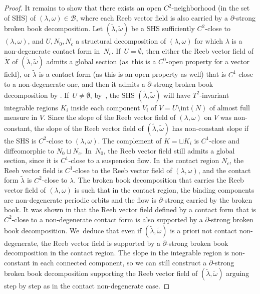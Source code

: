 \documentclass[11pt]{article}
\theoremstyle{definition}
\begin{document}
\begin{proof}
It remains to show that there exists an open $C^2$-neighborhood (in the set of SHS) of $(\lambda,\omega)\in \mathcal{B}$, where each Reeb vector field is also carried by a $\partial$-strong broken book decomposition. Let $(\widetilde \lambda, \widetilde \omega)$ be a SHS sufficiently $C^2$-close to $(\lambda,\omega)$, and $U, N_0, N_c$ a structural decomposition of $(\lambda,\omega)$ for which $\lambda$ is a non-degenerate contact form in~$N_c$. If~$U=\emptyset$, then either the Reeb vector field of $\widetilde X$ of $(\widetilde \lambda, \widetilde \omega)$ admits a global section (as~this is a $C^0$-open property for a vector field), or $\widetilde \lambda$ is a contact form (as this is an open property as well) that is $C^1$-close to a non-degenerate one, and then it admits a $\partial$-strong broken book decomposition by \cite[Th.\,1.1]{CDR}. If~$U\neq \emptyset$, by~\cite[Th.\,3.7]{CV1}, the SHS $(\widetilde \lambda, \widetilde \omega)$ will have $T^2$-invariant integrable regions $K_i$ inside each component $V_i$ of $V=U\setminus \text{int}(N)$ of almost full measure in $V$. Since the slope of the Reeb vector field of $(\lambda,\omega)$ on $V$ was non-constant, the slope of the Reeb vector field of $(\widetilde \lambda, \widetilde \omega)$ has non-constant slope if the SHS is $C^2$-close to $(\lambda,\omega)$. The complement of $K=\sqcup K_i$ is $C^1$-close and diffeomorphic to $N_0\sqcup N_c$. In~$N_0$, the Reeb vector field still admits a global section, since it is $C^1$-close to a suspension flow. In~the contact region $N_c$, the Reeb vector field is $C^1$-close to the Reeb vector field of $(\lambda, \omega)$, and the contact form $\widetilde \lambda$ is $C^2$-close to $\lambda$. The broken book decomposition that carries the Reeb vector field of $(\lambda,\omega)$ is such that in the contact region, the binding components are non-degenerate periodic orbits and the flow is $\partial$-strong carried by the broken book. It was shown in \cite[\S 4.7]{CDR} that the Reeb vector field defined by a contact form that is $C^2$-close to a non-degenerate contact form is also supported by a $\partial$-strong broken book decomposition. We~deduce that even if
$(\widetilde \lambda, \widetilde \omega)$ is a priori not contact non-degenerate, the Reeb vector field is supported by a $\partial$-strong broken book decomposition in the contact region.
The slope in the integrable region is non-constant in each connected component, so we can still construct a $\partial$-strong broken book decomposition supporting the Reeb vector field of $(\widetilde \lambda, \widetilde \omega)$ arguing step by step as in the contact non-degenerate case.
\end{proof}
\end{document}
